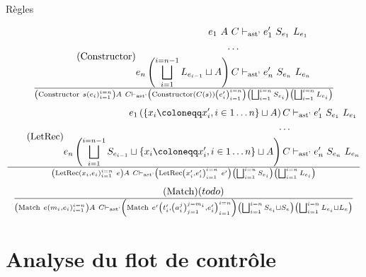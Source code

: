 \documentclass{beamer}
\begin{document}
\begin{frame}{Règles}
\begin{gather}
     \end{gather}
     \begin{gather}
        \tag{Constructor}
        \begin{split}
           e_1 ~ A ~ C &\vdash_{\text{ast'}} e_1' ~ S_{e_1} ~ L_{e_1} \\
           \dots \\
           e_n \left( \bigsqcup_{i=1}^{i=n-1} L_{e_{i-1}} \sqcup A \right) C &\vdash_{\text{ast'}} e_n' ~ S_{e_n} ~ L_{e_n}
        \end{split}
        \over \left( \text{Constructor} ~ s \left( e_i \right)_{i=1}^{i=n} \right) A ~ C \vdash_{\text{ast'}} \left( \text{Constructor} \left( C(s) \right) \left( e_i' \right)_{i=1}^{i=n} \right) \left( \bigsqcup_{i=1}^{i=n} S_{e_i} \right) \left( \bigsqcup_{i=1}^{i=n} L_{e_i} \right)
     \end{gather}
     \begin{gather}
        \tag{LetRec}
        \begin{split}
           e_1 \left( \lbrace x_i \coloneqq x_i', i \in 1 \dots n \rbrace \sqcup A \right) C &\vdash_{\text{ast'}} e_1' ~ S_{e_1} ~ L_{e_1} \\
           \dots \\
           e_n \left( \bigsqcup_{i=1}^{i=n-1} S_{e_{i-1}} \sqcup \lbrace x_i \coloneqq x_i', i \in 1 \dots n \rbrace \sqcup A \right) C &\vdash_{\text{ast'}} e_n' ~ S_{e_n} ~ L_{e_n}
        \end{split}
        \over \left( \text{LetRec} \left( x_i, e_i \right)_{i=1}^{i=n} ~ e \right) A ~ C \vdash_{\text{ast'}} \left( \text{LetRec} \left( x_i', e_i' \right)_{i=1}^{i=n} ~ e' \right) \left( \bigsqcup_{i=1}^{i=n} S_{e_i} \right) \left( \bigsqcup_{i=1}^{i=n} L_{e_i} \right)
     \end{gather}
     \begin{gather}
        \tag{Match}
        \begin{split}
        (todo)
        \end{split}
        \over \left( \text{Match} ~ e \left( m_i, e_i \right)_{i=1}^{i=n} \right) A ~ C \vdash_{\text{ast'}} \left( \text{Match} ~ e' \left( t_i', \left( a_i^j \right)_{j=1}^{j=m_i}, e_i' \right)_{i=1}^{i=n}\right) \left( \bigsqcup_{i=1}^{i=n} S_{e_i} \sqcup S_{e} \right) \left( \bigsqcup_{i=1}^{i=n} L_{e_i} \sqcup L_{e} \right)
     \end{gather}
\end{frame}

\section{Analyse du flot de contrôle}
\end{document}
